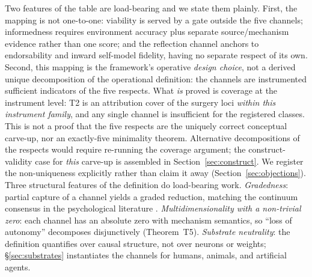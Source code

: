 \noindent Two features of the table are load-bearing and we state them
plainly. First, the mapping is not one-to-one: viability is served by a gate
outside the five channels; informedness requires environment accuracy plus
separate source/mechanism evidence rather than one score; and the reflection
channel anchors to endorsability and inward self-model fidelity, having no
separate respect of its own. Second, this mapping is the framework's
operative \emph{design choice}, not a derived unique decomposition of the
operational definition: the channels are instrumented sufficient indicators of
the five respects. What \emph{is} proved is coverage at the instrument level:
T2 is an attribution cover of the surgery loci \emph{within this instrument
family}, and any single channel is insufficient for the registered classes.
This is not a proof that the five respects are the uniquely correct conceptual
carve-up, nor an exactly-five minimality theorem.
Alternative decompositions of the respects would require re-running the
coverage argument; the construct-validity case for \emph{this} carve-up is
assembled in Section~\ref{sec:construct}. We register the non-uniqueness
explicitly rather than claim it away
(Section~\ref{sec:objections}). Three structural features of
the definition do load-bearing work. \emph{Gradedness}: partial capture of a
channel yields a graded reduction, matching the continuum consensus in the
psychological literature \citep{ryan_deci2000}. \emph{Multidimensionality with
a non-trivial zero}: each channel has an absolute zero with mechanism
semantics, so ``loss of autonomy'' decomposes disjunctively (Theorem~T5).
\emph{Substrate neutrality}: the definition quantifies over causal structure,
not over neurons or weights; \S\ref{sec:substrates} instantiates the
channels for humans, animals, and artificial agents.

